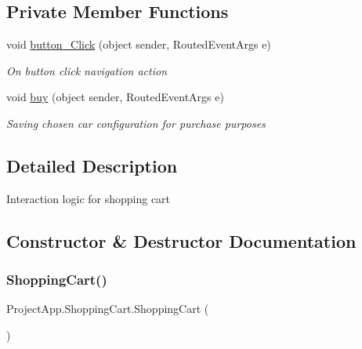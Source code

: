 \subsection*{Private Member Functions}
\begin{DoxyCompactItemize}
\item 
void \mbox{\hyperlink{class_project_app_1_1_shopping_cart_aaebbb0f6f8dcbae842556c7c5515f8b2}{button\+\_\+\+Click}} (object sender, Routed\+Event\+Args e)
\begin{DoxyCompactList}\small\item\em On button click navigation action \end{DoxyCompactList}\item 
void \mbox{\hyperlink{class_project_app_1_1_shopping_cart_a157d531a399c820c0ae7dfa04c171a75}{buy}} (object sender, Routed\+Event\+Args e)
\begin{DoxyCompactList}\small\item\em Saving chosen car configuration for purchase purposes \end{DoxyCompactList}\end{DoxyCompactItemize}


\subsection{Detailed Description}
Interaction logic for shopping cart 



\subsection{Constructor \& Destructor Documentation}
\mbox{\label{class_project_app_1_1_shopping_cart_aa1f85785a6afbd74611e27aec40dab81}} 
\subsubsection{\texorpdfstring{Shopping\+Cart()}{ShoppingCart()}}
{\footnotesize\ttfamily Project\+App.\+Shopping\+Cart.\+Shopping\+Cart (\begin{DoxyParamCaption}{ }\end{DoxyParamCaption})}



